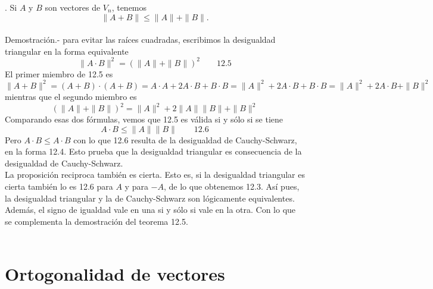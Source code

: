 \begin{teo}. Si $A$ y $B$ son vectores de $V_n$, tenemos $$\|A+B\| \leq \|A\|+\|B\|.$$\\
    Demostración.-\; para evitar las raíces cuadradas, escribimos la desigualdad triangular en la forma equivalente $$\|A\cdot B\|^2 = \left(\|A\|+\|B\|\right)^2\qquad \mbox{12.5}$$
    El primer miembro de 12.5 es $$\|A+B\|^2 = (A+B)\cdot (A+B) = A\cdot A + 2A\cdot B + B\cdot B = \|A\|^2 + 2A\cdot B + B\cdot B = \|A\|^2 + 2A\cdot B + \|B\|^2$$
    mientras que el segundo miembro es $$\left(\|A\|+\|B\|\right)^2 = \|A\|^2 + 2\|A\|\|B\|+\|B\|^2$$
    Comparando esas dos fórmulas, vemos que 12.5 es válida si y sólo si se tiene $$A\cdot B \leq \|A\|\|B\|\qquad 12.6$$
    Pero $A\cdot B\leq A\cdot B$ con lo que 12.6 resulta de la desigualdad de Cauchy-Schwarz, en la forma 12.4. Esto prueba que la desigualdad triangular es consecuencia de la desigualdad de Cauchy-Schwarz.\\
    La proposición reciproca también es cierta. Esto es, si la desigualdad triangular es cierta también lo es 12.6 para $A$ y para $-A$, de lo que obtenemos 12.3. Así pues, la desigualdad triangular y la de Cauchy-Schwarz son lógicamente equivalentes. Además, el signo de igualdad vale en una si y sólo si vale en la otra. Con lo que se complementa la demostración del teorema 12.5.\\\\

\end{teo}

\section{Ortogonalidad de vectores}
